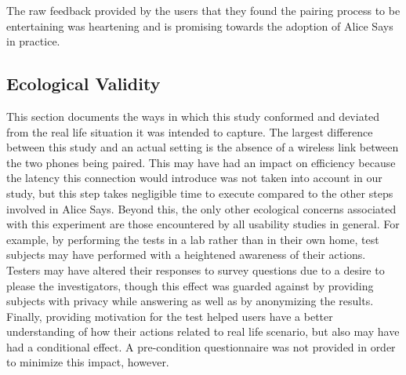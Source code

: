 The raw feedback provided by the users that they found the pairing process to
be entertaining was heartening and is promising towards the adoption of Alice
Says in practice.  

\subsection{Ecological Validity}

This section documents the ways in which this study conformed and deviated from
the real life situation it was intended to capture. The largest difference
between this study and an actual setting is the absence of a wireless link
between the two phones being paired. This may have had an impact on efficiency
because the latency this connection would introduce was not taken into account
in our study, but this step takes negligible time to execute compared to the
other steps involved in Alice Says. Beyond this, the only other ecological
concerns associated with this experiment are those encountered by all usability
studies in general. For example, by performing the tests in a lab rather than
in their own home, test subjects may have performed with a heightened awareness
of their actions. Testers may have altered their responses to survey questions
due to a desire to please the investigators, though this effect was guarded
against by providing subjects with privacy while answering as well as by
anonymizing the results. Finally, providing motivation for the test helped
users have a better understanding of how their actions related to real life
scenario, but also may have had a conditional effect. A pre-condition
questionnaire was not provided in order to minimize this impact, however.
